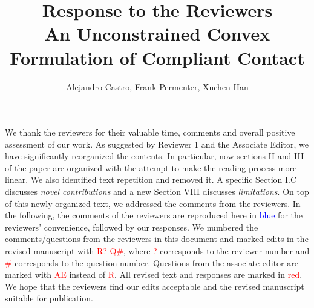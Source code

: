\documentclass[12pt]{article}
\begin{document}
\author{Alejandro Castro, Frank Permenter, Xuchen Han}
\title{Response to the Reviewers \\
  \large An Unconstrained Convex Formulation of Compliant Contact}
\maketitle

We thank the reviewers for their valuable time, comments and overall positive
assessment of our work. As suggested by Reviewer 1 and the Associate Editor, we have
significantly reorganized the contents. In particular, now sections II
and III of the paper are organized with the attempt to make the reading process
more linear. We also identified text repetition and removed it. A specific
Section I.C discusses \emph{novel contributions} and a new Section VIII
discusses \emph{limitations}. On top of this
newly organized text, we addressed the comments from the reviewers. In the
following, the comments of the reviewers are reproduced here in
\textcolor{blue}{blue} for the reviewers' convenience, followed by our
responses. We numbered the comments/questions from the reviewers in this
document and marked edits in the revised manuscript with
\textcolor{red}{R?-Q\#}, where \textcolor{red}{?} corresponds to the reviewer
number and \textcolor{red}{\#} corresponds to the question number. Questions
from the associate editor are marked with \textcolor{red}{AE} instead of
\textcolor{red}{R}. All revised text and responses are marked in
\textcolor{red}{red}. We hope that the reviewers find our edits acceptable and
the revised manuscript suitable for publication.








\end{document}
